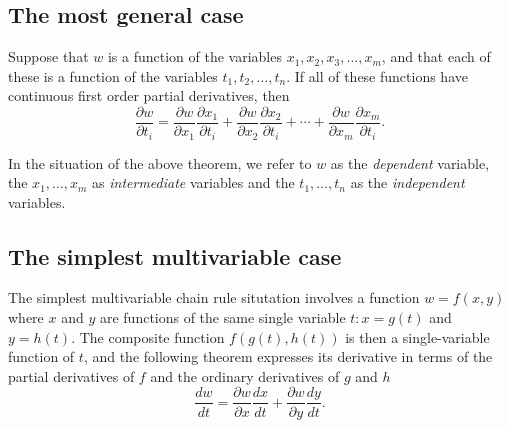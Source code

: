 \documentclass[a4paper]{article}
\begin{document}
\subsection{The most general case}
Suppose that $w$ is a function of the variables $x_{1},x_{2},x_{3},\ldots,x_{m}$, and that each of these is a function of the variables $t_{1},t_{2},\ldots,t_{n}$. If all of these functions have continuous first order partial derivatives, then
  \begin{equation}
    \frac{\partial{w}}{\partial{t_{i}}} = \frac{\partial{w}}{\partial{x_{1}}}\frac{\partial{x_{1}}}{\partial{t_{i}}}
    + \frac{\partial{w}}{\partial{x_{2}}}\frac{\partial{x_{2}}}{\partial{t_{i}}}
    + \cdots
    + \frac{\partial{w}}{\partial{x_{m}}}\frac{\partial{x_{m}}}{\partial{t_{i}}}.
  \end{equation}

In the situation of the above theorem, we refer to $w$ as the \emph{dependent} variable, the $x_{1},\ldots,x_{m}$ as \emph{intermediate} variables and the $t_{1},\ldots,t_{n}$ as the \emph{independent} variables.

\subsection{The simplest multivariable case}
The simplest multivariable chain rule situtation involves a function $w = f(x, y)$ where $x$ and $y$ are functions of the same single variable $t:x=g(t)$ and $y=h(t)$. The composite function $f(g(t), h(t))$ is then a single-variable function of $t$, and the following theorem expresses its derivative in terms of the partial derivatives of $f$ and the ordinary derivatives of $g$ and $h$
  \begin{equation}
    \frac{dw}{dt} = \frac{\partial{w}}{\partial{x}}\frac{dx}{dt}+\frac{\partial{w}}{\partial{y}}\frac{dy}{dt}.
  \end{equation}
\end{document}
